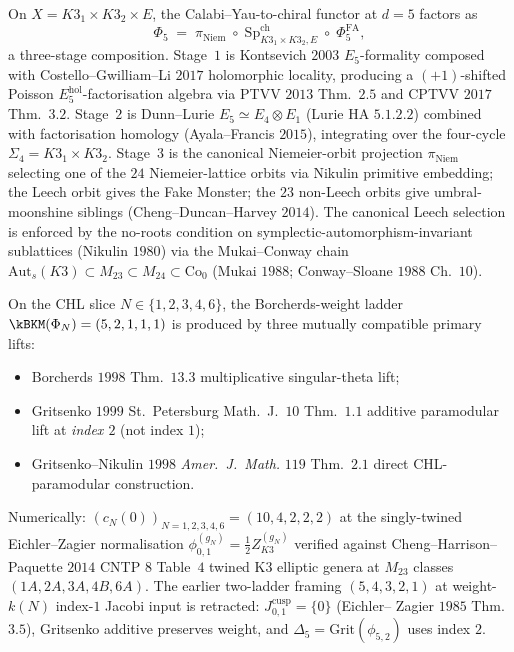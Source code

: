 \begin{theorem}[Three-stage factorisation at $d = 5$]
\label{wn:thm:wave3-three-stage-d5}\ClaimStatusTheorem
On $X = K3_1 \times K3_2 \times E$, the Calabi--Yau-to-chiral functor
at $d = 5$ factors as
\[
\Phi_5 \;=\; \pi_{\mathrm{Niem}}
\;\circ\; \mathrm{Sp}^{\mathrm{ch}}_{K3_1 \times K3_2, E}
\;\circ\; \Phi^{\mathrm{FA}}_5,
\]
a three-stage composition. Stage~$1$ is Kontsevich $2003$
$E_5$-formality composed with Costello--Gwilliam--Li $2017$ holomorphic
locality, producing a $(+1)$-shifted Poisson $E_5^{\mathrm{hol}}$-factorisation
algebra via PTVV $2013$ Thm.~$2.5$ and CPTVV $2017$ Thm.~$3.2$.
Stage~$2$ is Dunn--Lurie $E_5 \simeq E_4 \otimes E_1$ (Lurie HA
$5.1.2.2$) combined with factorisation homology
(Ayala--Francis $2015$), integrating over the four-cycle $\Sigma_4 =
K3_1 \times K3_2$. Stage~$3$ is the canonical Niemeier-orbit projection
$\pi_{\mathrm{Niem}}$ selecting one of the $24$ Niemeier-lattice orbits
via Nikulin primitive embedding; the Leech orbit gives the Fake
Monster; the $23$ non-Leech orbits give umbral-moonshine siblings
(Cheng--Duncan--Harvey $2014$). The canonical Leech selection is
enforced by the no-roots condition on symplectic-automorphism-invariant
sublattices (Nikulin $1980$) via the Mukai--Conway chain
$\mathrm{Aut}_s(K3) \subset M_{23} \subset M_{24} \subset \mathrm{Co}_0$
(Mukai $1988$; Conway--Sloane $1988$ Ch.~$10$).
\end{theorem}

\begin{theorem}
\label{wn:thm:wave3-single-ladder}\ClaimStatusTheorem
On the CHL slice $N \in \{1, 2, 3, 4, 6\}$, the Borcherds-weight ladder
$\kBKM(\Phi_N) = (5, 2, 1, 1, 1)$ is produced by three mutually
compatible primary lifts:
\begin{itemize}
\item Borcherds $1998$ Thm.~$13.3$ multiplicative singular-theta lift;
\item Gritsenko $1999$ St.~Petersburg Math.~J.~$10$ Thm.~$1.1$
additive paramodular lift at \emph{index $2$} (not index $1$);
\item Gritsenko--Nikulin $1998$ \emph{Amer.~J.~Math.} $119$ Thm.~$2.1$
direct CHL-paramodular construction.
\end{itemize}
Numerically: $(c_N(0))_{N=1,2,3,4,6} = (10, 4, 2, 2, 2)$ at the
singly-twined Eichler--Zagier normalisation
$\phi^{(g_N)}_{0, 1} = \tfrac{1}{2} Z^{(g_N)}_{K3}$ verified against
Cheng--Harrison--Paquette $2014$ CNTP $8$ Table~$4$ twined K3 elliptic
genera at $M_{23}$ classes $(1A, 2A, 3A, 4B, 6A)$. The earlier
two-ladder framing $(5, 4, 3, 2, 1)$ at weight-$k(N)$ index-$1$
Jacobi input is retracted: $J^{\mathrm{cusp}}_{0, 1} = \{0\}$ (Eichler--
Zagier $1985$ Thm.~$3.5$), Gritsenko additive preserves weight, and
$\Delta_5 = \mathrm{Grit}(\phi_{5, 2})$ uses index $2$.
\end{theorem}

